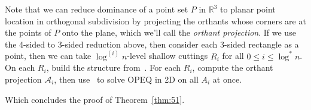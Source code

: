 \documentclass[letterpaper,12pt,twocolumn]{article}
\newcommand\IR{\mathbb{R}}
\theoremstyle{plain}
\begin{document}
Note that we can reduce dominance of a point set $P$ in $\IR^3$ to
planar point location in orthogonal subdivision by projecting the
orthants whose corners are at the points of $P$ onto the plane, which
we'll call the \emph{orthant projection}.  If we use the 4-sided to
3-sided reduction above, then consider each 3-sided rectangle as a
point, then we can take $\log^{(i)} n$-level shallow cuttings $R_i$
for all $0 \le i \le \log^* n$.  On each $R_i$, build the structure
from~\cite{afshani2008dominance}.  For each $R_i$, compute the orthant
projection $\mathcal{A}_i$, then use~\cite{chazelle1986filtering} to
solve OPEQ in 2D on all $A_i$ at once.

Which concludes the proof of Theorem~\ref{thm:51}.



\end{document}
